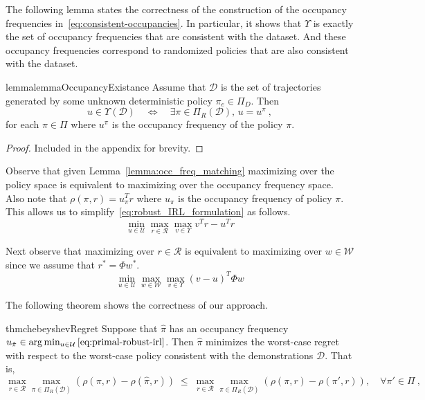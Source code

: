 \documentclass[10pt]{article}
\begin{document}
The following lemma states the correctness of the construction of the occupancy frequencies in~\eqref{eq:consistent-occupancies}. In particular, it shows that $\Upsilon$ is exactly the set of occupancy frequencies that are consistent with the dataset. And these occupancy frequencies correspond to randomized policies that are also consistent with the dataset.

\begin{restatable}{lemma}{lemmaOccupancyExistance}
\label{lemma:occ_freq_matching}
    	Assume that $\mathcal{D}$ is the set of trajectories generated by some unknown deterministic policy $\pi_e \in \Pi_D$. Then
	\[
		u \in \Upsilon(\mathcal{D})  \quad \Leftrightarrow \quad  \exists \pi \in \Pi_R(\mathcal{D}), \, u = u^{\pi}~,
	\]
	for each $\pi \in \Pi$ where $u^{\pi}$ is the occupancy frequency of the policy $\pi$.
\end{restatable}
\begin{proof}
	Included in the appendix for brevity.
\end{proof}

Observe that given Lemma~\ref{lemma:occ_freq_matching} maximizing over the policy space is equivalent to maximizing over the occupancy frequency space.
Also note that $\rho(\pi,r) = u_{\pi}^T r$ where $u_{\pi}$ is the occupancy frequency of policy $\pi$. This allows us to simplify~\eqref{eq:robust_IRL_formulation} as follows.
%
\begin{equation}
	\min_{u \in \mathcal{U}} \max_{r \in \mathcal{R}} \max_{v \in \Upsilon} v^T r - u^T r
\end{equation}

Next observe that maximizing over $r \in \mathcal{R}$ is equivalent to maximizing over $w \in \mathcal{W}$ since we assume that $r^* = \Phi w^*$.
%
\begin{equation}\label{eq:primal-robust-irl}
	\min_{u \in \mathcal{U}} \max_{w \in \mathcal{W}} \max_{v \in \Upsilon} (v - u)^T \Phi w
\end{equation}


The following theorem shows the correctness of our approach.

\begin{restatable}{thm}{chebeyshevRegret}
\label{thrm:chebeyshevRegret}
	Suppose that $\hat{\pi}$ has an occupancy frequency $u_{\hat{\pi}} \in \arg\min_{u \in \mathcal{U}} \ref{eq:primal-robust-irl}$.
	Then $\hat{\pi}$ minimizes the worst-case regret with respect to the worst-case policy consistent with the demonstrations $\mathcal{D}$. That is,
	\[
		\max_{r\in \mathcal{R}} \max_{\pi \in \Pi_{R}(\mathcal{D})} \left(\rho(\pi, r) - \rho(\hat{\pi}, r)\right)
		\; \le\;
		\max_{r\in \mathcal{R}} \max_{\pi \in \Pi_{R}(\mathcal{D})} \left(\rho(\pi, r) - \rho(\pi', r)\right), \quad  \forall \pi' \in \Pi~,
	\]
\end{restatable}
\end{document}
